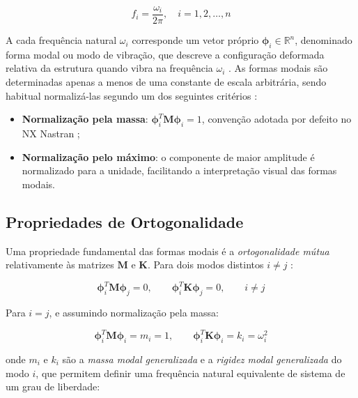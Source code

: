 \documentclass[11pt,oneside,a4paper,final]{report}
\begin{document}
\begin{equation}
    f_i = \frac{\omega_i}{2\pi}, \quad i = 1, 2, \ldots, n
    \label{eq:freq_hz}
\end{equation}

A cada frequência natural $\omega_i$ corresponde um vetor próprio $\boldsymbol{\phi}_i \in \mathbb{R}^n$, denominado forma modal ou modo de vibração, que descreve a configuração deformada relativa da estrutura quando vibra na frequência $\omega_i$ \cite{Ewins2000, Maia1997}. As formas modais são determinadas apenas a menos de uma constante de escala arbitrária, sendo habitual normalizá-las segundo um dos seguintes critérios \cite{Craig2006}:

\begin{itemize}
    \item \textbf{Normalização pela massa}: $\boldsymbol{\phi}_i^T \mathbf{M} \boldsymbol{\phi}_i = 1$, convenção adotada por defeito no NX Nastran \cite{Nastran2014};

    \item \textbf{Normalização pelo máximo}: o componente de maior amplitude é normalizado para a unidade, facilitando a interpretação visual das formas modais.
\end{itemize}

\subsection{Propriedades de Ortogonalidade}

Uma propriedade fundamental das formas modais é a \textit{ortogonalidade mútua} relativamente às matrizes $\mathbf{M}$ e $\mathbf{K}$. Para dois modos distintos $i \neq j$ \cite{Clough1993, Inman2014}:

\begin{equation}
    \boldsymbol{\phi}_i^T \mathbf{M} \boldsymbol{\phi}_j = 0, \qquad 
    \boldsymbol{\phi}_i^T \mathbf{K} \boldsymbol{\phi}_j = 0, \qquad i \neq j
    \label{eq:ortogonalidade}
\end{equation}

Para $i = j$, e assumindo normalização pela massa:

\begin{equation}
    \boldsymbol{\phi}_i^T \mathbf{M} \boldsymbol{\phi}_i = m_i = 1, \qquad
    \boldsymbol{\phi}_i^T \mathbf{K} \boldsymbol{\phi}_i = k_i = \omega_i^2
    \label{eq:massas_rigidezes_modais}
\end{equation}

\noindent onde $m_i$ e $k_i$ são a \textit{massa modal generalizada} e a \textit{rigidez modal generalizada} do modo $i$, que permitem definir uma frequência natural equivalente de sistema de um grau de liberdade:
\end{document}

